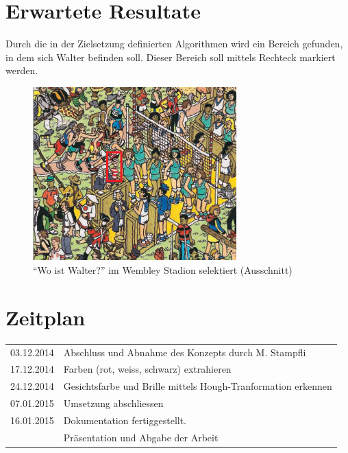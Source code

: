 \documentclass[paper=a4,fontsize=12pt]{scrartcl}
\begin{document}
\section*{Erwartete Resultate}
Durch die in der Zielsetzung definierten Algorithmen wird ein Bereich gefunden, in dem sich Walter befinden soll. Dieser Bereich soll mittels Rechteck markiert werden.
\begin{figure}[htbp] 
  \centering
     \includegraphics[width=0.7\textwidth]{img/WallyWembleyCroppedSelected.png}
  \caption{``Wo ist Walter?'' im Wembley Stadion selektiert (Ausschnitt)}
  \label{fig:Bild1}
\end{figure}


\section*{Zeitplan}
\begin{tabular}{rl}
    03.12.2014	&	Abschluss und Abnahme des Konzepts durch M. Stampfli \\
    17.12.2014	&	Farben (rot, weiss, schwarz) extrahieren \\
    24.12.2014	&	Gesichtsfarbe und Brille mittels Hough-Tranformation erkennen \\
    07.01.2015	&	Umsetzung abschliessen  \\
    16.01.2015	&	Dokumentation fertiggestellt.  \\
                &	Präsentation und Abgabe der Arbeit  \\
    
\end{tabular}
\end{document}
